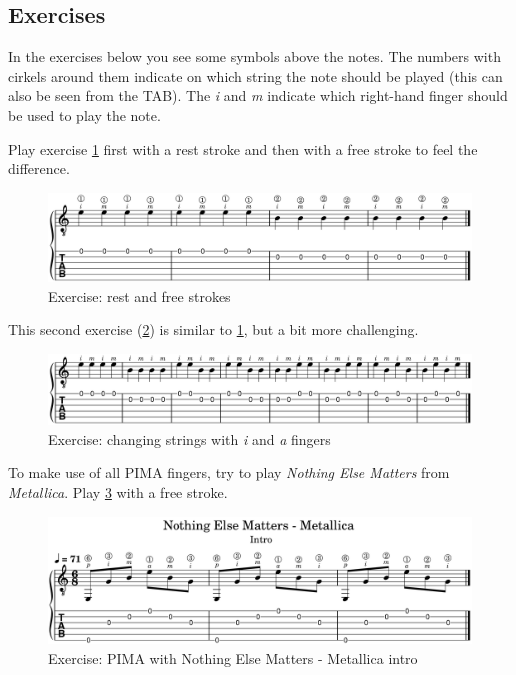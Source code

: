 \newpage

\subsection{Exercises}

In the exercises below you see some symbols above the notes. The numbers with cirkels around them indicate on which string the note should be played (this can also be seen from the TAB). The \textit{i} and \textit{m} indicate which right-hand finger should be used to play the note.

Play exercise \ref{fig:exercise_rest_free_stroke} first with a rest stroke and then with a free stroke to feel the difference.

\begin{figure}[h]
    \centering
    \includegraphics[width=\textwidth]{../MuseScore/Guitar/OpenEnVallendeAanslag.png}
    \caption{Exercise: rest and free strokes}
    \label{fig:exercise_rest_free_stroke}
\end{figure}

This second exercise (\ref{fig:exercise_i_m_string_change}) is similar to \ref{fig:exercise_rest_free_stroke}, but a bit more challenging.

\begin{figure}[h]
    \centering
    \includegraphics[width=\textwidth]{../MuseScore/Guitar/TwoStringAlternating.png}
    \caption{Exercise: changing strings with \textit{i} and \textit{a} fingers}
    \label{fig:exercise_i_m_string_change}
\end{figure}

To make use of all PIMA fingers, try to play \textit{Nothing Else Matters} from \textit{Metallica}. Play \ref{fig:exercise_nothing_else_matters_metallica_intro_pima} with a free stroke.

\begin{figure}[h]
    \centering
    \includegraphics[width=\textwidth]{../MuseScore/Guitar/NothinElseMatters_Metallica_Intro.png}
    \caption{Exercise: PIMA with Nothing Else Matters - Metallica intro}
    \label{fig:exercise_nothing_else_matters_metallica_intro_pima}
\end{figure}

